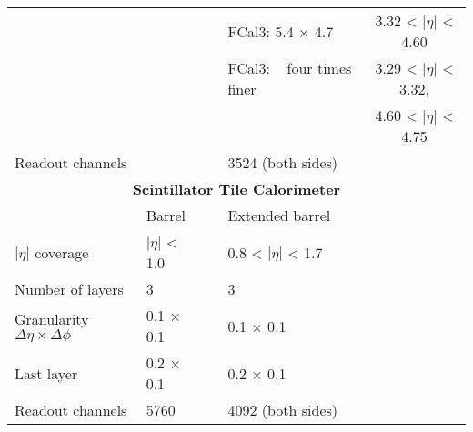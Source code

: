 \begin{table}[]
\begin{tabular}{|l|lc|lc|}
                                               &                   &                                    & FCal3: 5.4 × 4.7                & 3.32 < $|\eta|$ < 4.60   \\
                                               &                   &                                    & FCal3: ~ four times finer       & 3.29 < $|\eta|$ < 3.32,  \\
                                               &                   &                                    &                                 & 4.60 < $|\eta|$ < 4.75   \\
\hline 
Readout channels                               &                   &                                    & 3524 (both sides)               &                                     \\
\hline 
                                               \multicolumn{5}{|c|}{\textbf{Scintillator Tile Calorimeter}} \\
\hline 
                                               & Barrel            &                                    & Extended barrel                 &                                     \\
\hline 
$|\eta|$ coverage                              &    $|\eta|$ < 1.0 &                                    & 0.8 < $|\eta|$ < 1.7 &                                     \\
Number of layers                               & 3                 &                                    & 3                               &                                     \\
\hline 
Granularity $\Delta \eta \times \Delta \phi$   & 0.1 × 0.1         &                                    & 0.1 × 0.1                       &                                     \\
Last layer                                     & 0.2 × 0.1         &                                    & 0.2 × 0.1                       &                                     \\
\hline 
Readout channels                               & 5760              &                                    & 4092 (both sides)               &                                    \\
\hline 
\end{tabular} \end{table}
